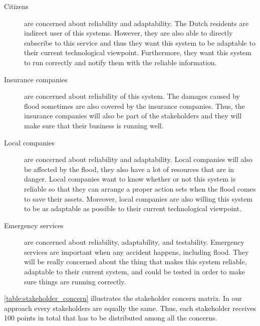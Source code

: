 \begin{description}
\item[Citizens] are concerned about reliability and adaptability. The Dutch residents are indirect user of this systems. However, they are also able to directly subscribe to this service and thus they want this system to be adaptable to their current technological viewpoint. Furthermore, they want this system to run correctly and notify them with the reliable information.
\item[Insurance companies] are concerned about reliability of this system. The damages caused by flood sometimes are also covered by the insurance companies. Thus, the insurance companies will also be part of the stakeholders and they will make sure that their business is running well.
\item[Local companies] are concerned about reliability and adaptability. Local companies will also be affected by the flood, they also have a lot of resources that are in danger. Local companies want to know whether or not this system is reliable so that they can arrange a proper action sets when the flood comes to save their assets. Moreover, local companies are also willing this system to be as adaptable as possible to their current technological viewpoint.
\item[Emergency services] are concerned about reliability, adaptability, and testability. Emergency services are important when any accident happens, including flood. They will be really concerned about the thing that makes this system reliable, adaptable to their current system, and could be tested in order to make sure things are running correctly.
\end{description}

\autoref{table:stakeholder_concern} illustrates the stakeholder concern matrix. In our approach every stakeholders are equally the same. Thus, each stakeholder receives 100 points in total that has to be distributed among all the concerns.

